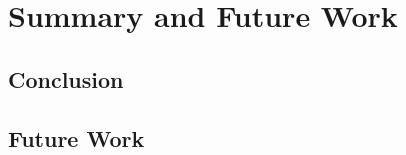 \section{Summary and Future Work}\label{sec:timeplan}
\subsection{Conclusion}\label{subsec:conclusion}
\subsection{Future Work}\label{subsec:futurework}




